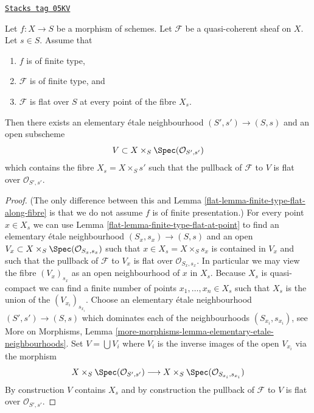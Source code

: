 \begin{lemma}
\label{flat-lemma-finite-type-flat-along-fibre-variant}
\href{https://stacks.math.columbia.edu/tag/05KV}{\texttt{Stacks tag 05KV}}

Let $f : X \to S$ be a morphism of schemes.
Let $\mathcal{F}$ be a quasi-coherent sheaf on $X$.
Let $s \in S$.
Assume that
\begin{enumerate}
\item $f$ is of finite type,
\item $\mathcal{F}$ is of finite type, and
\item $\mathcal{F}$ is flat over $S$ at every point of the fibre $X_s$.
\end{enumerate}
Then there exists an elementary \'etale neighbourhood $(S', s') \to (S, s)$
and an open subscheme
$$
V \subset X \times_S \Spec(\mathcal{O}_{S', s'})
$$
which contains the fibre $X_s = X \times_S s'$ such that the pullback
of $\mathcal{F}$ to $V$ is flat over $\mathcal{O}_{S', s'}$.
\end{lemma}

\begin{proof}

(The only difference between this and
Lemma \ref{flat-lemma-finite-type-flat-along-fibre}
is that we do not assume $f$ is of finite presentation.)
For every point $x \in X_s$ we can use
Lemma \ref{flat-lemma-finite-type-flat-at-point}
to find an elementary \'etale neighbourhood $(S_x, s_x) \to (S, s)$
and an open $V_x \subset X \times_S \Spec(\mathcal{O}_{S_x, s_x})$
such that $x \in X_s = X \times_S s_x$ is contained in $V_x$ and such that
the pullback of $\mathcal{F}$ to $V_x$ is flat over
$\mathcal{O}_{S_x, s_x}$. In particular we may view the fibre
$(V_x)_{s_x}$ as an open neighbourhood of $x$ in $X_s$.
Because $X_s$ is quasi-compact we can find a finite number of points
$x_1, \ldots, x_n \in X_s$ such that $X_s$ is the union of
the $(V_{x_i})_{s_{x_i}}$. Choose an elementary \'etale neighbourhood
$(S' , s') \to (S, s)$ which dominates each of the neighbourhoods
$(S_{x_i}, s_{x_i})$, see
More on Morphisms,
Lemma \ref{more-morphisms-lemma-elementary-etale-neighbourhoods}.
Set $V = \bigcup V_i$ where $V_i$ is the inverse images of the open
$V_{x_i}$ via the morphism
$$
X \times_S \Spec(\mathcal{O}_{S', s'})
\longrightarrow
X \times_S \Spec(\mathcal{O}_{S_{x_i}, s_{x_i}})
$$
By construction $V$ contains $X_s$ and by construction the pullback
of $\mathcal{F}$ to $V$ is flat over $\mathcal{O}_{S', s'}$.
\end{proof}

